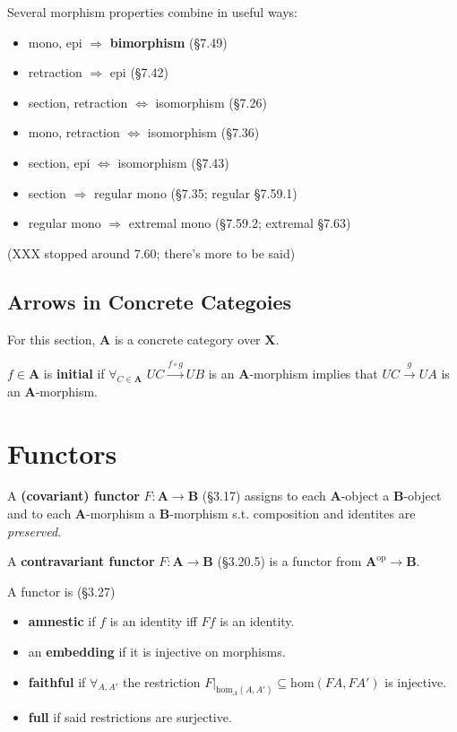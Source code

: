 \documentclass[10pt,twocolumn,letterpaper]{article}
\newcommand{\defn}[1]{{\bf #1}}
\begin{document}
  Several morphism properties combine in useful ways:
  \begin{itemize}
    \item mono, epi $\Rightarrow$ \defn{bimorphism} (\S7.49)
    \item retraction $\Rightarrow$ epi (\S7.42)
    \item section, retraction $\Leftrightarrow$ isomorphism (\S7.26)
    \item mono, retraction $\Leftrightarrow$ isomorphism (\S7.36)
    \item section, epi $\Leftrightarrow$ isomorphism (\S7.43)
    \item section $\Rightarrow$ regular mono (\S7.35; regular \S7.59.1)
    \item regular mono $\Rightarrow$ extremal mono (\S7.59.2; extremal \S7.63)
  \end{itemize}
  (XXX stopped around 7.60; there's more to be said)

\subsection{Arrows in Concrete Categoies}

  For this section, $\mathbf{A}$ is a concrete category over $\mathbf{X}$.

  $f \in \mathbf{A}$ is \defn{initial} if $\forall_{C \in \mathbf{A}}$ $UC
  \overset{f \circ g}{\to} UB$ is an $\mathbf{A}$-morphism implies that $UC
  \overset{g}{\to} UA$ is an $\mathbf{A}$-morphism.

\section{Functors}

  A \defn{(covariant) functor} $F : \mathbf{A} \to \mathbf{B}$ (\S3.17)
  assigns to each $\mathbf{A}$-object a $\mathbf{B}$-object and to each
  $\mathbf{A}$-morphism a $\mathbf{B}$-morphism s.t. composition and
  identites are {\em preserved}.

  A \defn{contravariant functor} $F : \mathbf{A} \to \mathbf{B}$ (\S3.20.5)
  is a functor from $\mathbf{A}^\text{op} \to \mathbf{B}$.

  A functor is (\S3.27)
  \begin{itemize}
    \item \defn{amnestic} if $f$ is an identity iff $Ff$ is an identity.
    \item an \defn{embedding} if it is injective on morphisms.
    \item \defn{faithful} if $\forall_{A,A'}$ the restriction $F\vert_{\mbox{hom}_A(A,A')}
      \subseteq \mbox{hom}(FA, FA')$ is injective.
    \item \defn{full} if said restrictions are surjective.
  \end{itemize}
\end{document}
